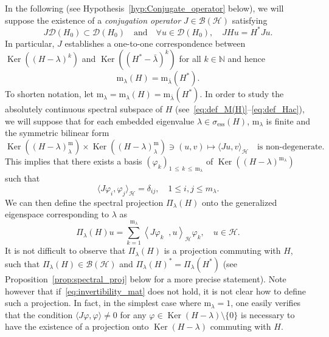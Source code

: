 \documentclass[10pt]{amsart}
\theoremstyle{definition}\newtheorem{defi}[theo]{Definition}\newtheorem{rema}[theo]{Remark}\newtheorem{exam}[theo]{Example}\newtheorem{exem}[theo]{Example}\newtheorem{nota}[theo]{Notation}
\newcommand{\Hi}{\mathcal{H}}
\newcommand{\N}{\mathbb{N}}
\newcommand{\ess}{\mathrm{ess}}
\newcommand{\rmm}{\mathrm{m}}
\newcommand{\scal}[2]{\left\langle{#1} \middle., {#2}\right\rangle}
\newcommand{\clB}{\mathcal{B}}
\newcommand{\clD}{\mathcal{D}}
\DeclareMathOperator{\Ker}{Ker}
\let\oldforall\forall
\renewcommand*{\forall}{\mathrel{\oldforall}}
\begin{document}
In the following (see Hypothesis~\ref{hyp:Conjugate_operator} below), we will suppose the existence of a \emph{conjugation operator} $J\in\clB(\Hi)$ satisfying
\begin{equation}\label{eq:existence_J}
J\clD(H_0)\subset\clD(H_0) \quad\text{and}\quad\forall u\in\clD(H_0), \quad JHu=H^* Ju.
\end{equation}
In particular, $J$ establishes a one-to-one correspondence between $\Ker((H-\lambda)^{k})$ and $\Ker((H^*-\bar{\lambda})^{k})$ for all $k\in\N$ and hence
\begin{equation*}
\rmm_\lambda(H)=\rmm_{\bar{\lambda}}(H^*).
\end{equation*}
To shorten notation, let $\rmm_\lambda=\rmm_\lambda(H)=\rmm_{\bar\lambda}(H^*)$. In order to study the absolutely continuous spectral subspace of $H$ (see~\eqref{eq:def_M(H)}--\eqref{eq:def_Hac}), we will suppose that for each embedded eigenvalue $\lambda\in\sigma_{\ess}(H)$, $\rmm_\lambda$ is finite and the symmetric bilinear form
\begin{equation}\label{eq:invertibility_mat}
\Ker((H-\lambda)^\mathrm{m}_\lambda)\times\Ker((H-\lambda)^\mathrm{m}_\lambda) \ni (u,v)\mapsto \langle Ju,v\rangle_\Hi \quad\text{is non-degenerate}.
\end{equation}
This implies that there exists a basis $(\varphi_k)_{1\,\leq\,k\,\leq\,\rmm_\lambda}$ of $\Ker((H-\lambda)^{\rmm_\lambda})$ such that
\begin{equation*}
\langle J \varphi_i, \varphi_j \rangle_{\Hi} = \delta_{ij}, \quad 1\le i,j\le m_\lambda.
\end{equation*}
We can then define the spectral projection $\Pi_\lambda(H)$ onto the generalized eigenspace corresponding to $\lambda$ as
\begin{equation}\label{eq:proj_emb}
\Pi_\lambda(H)u = \sum_{k=1}^{\rmm_\lambda}\scal{J\varphi_k}{u}_{\Hi}\varphi_k, \quad u \in \Hi.
\end{equation}
It is not difficult to observe that $\Pi_\lambda(H)$ is a projection commuting with $H$, such that $\Pi_\lambda(H)\in\clB(\Hi)$ and $\Pi_\lambda(H)^*=\Pi_\lambda(H^*)$ (see Proposition~\ref{prop:spectral_proj} below for a more precise statement). Note however that if~\eqref{eq:invertibility_mat} does not hold, it is not clear how to define such a projection. In fact, in the simplest case where $\rmm_\lambda=1$, one easily verifies that the condition $\langle J\varphi,\varphi\rangle\neq0$ for any $\varphi\in\Ker(H-\lambda)\setminus\{0\}$ is necessary to have the existence of a projection onto $\Ker(H-\lambda)$ commuting with $H$.
\end{document}
